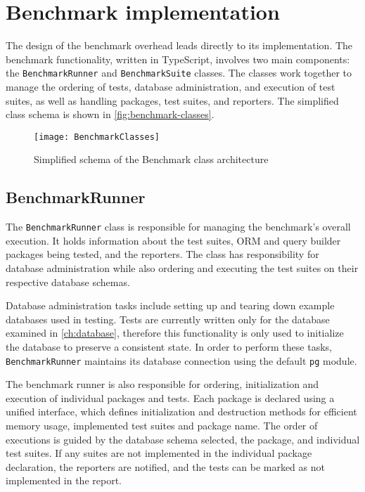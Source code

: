 \chapter{Benchmark implementation}

The design of the benchmark overhead leads directly to its implementation. The
benchmark functionality, written in TypeScript, involves two main components:
the \texttt{BenchmarkRunner} and \texttt{BenchmarkSuite} classes. The classes
work together to manage the ordering of tests, database administration, and
execution of test suites, as well as handling packages, test suites, and
reporters. The simplified class schema is shown in \autoref{fig:benchmark-classes}.

\begin{figure}[hp]
    \caption{Simplified schema of the Benchmark class architecture}
    \centering
    \label{fig:benchmark-classes}
    \texttt{[image: BenchmarkClasses]}
\end{figure}

\section{BenchmarkRunner}

The \texttt{BenchmarkRunner} class is responsible for managing the benchmark’s
overall execution. It holds information about the test suites, ORM and query
builder packages being tested, and the reporters. The class has responsibility
for database administration while also ordering and executing the test suites on
their respective database schemas.

Database administration tasks include setting up and tearing down example
databases used in testing. Tests are currently written only for the database
examined in \autoref{ch:database}, therefore this functionality is only used
to initialize the database to preserve a consistent state. In order to perform
these tasks, \texttt{BenchmarkRunner} maintains its database connection using
the default \texttt{pg} module.

The benchmark runner is also responsible for ordering, initialization and
execution of individual packages and tests. Each package is declared using a
unified interface, which defines initialization and destruction methods for
efficient memory usage, implemented test suites and package name. The order of
executions is guided by the database schema selected, the package, and
individual test suites. If any suites are not implemented in the individual
package declaration, the reporters are notified, and the tests can be marked as
not implemented in the report.

